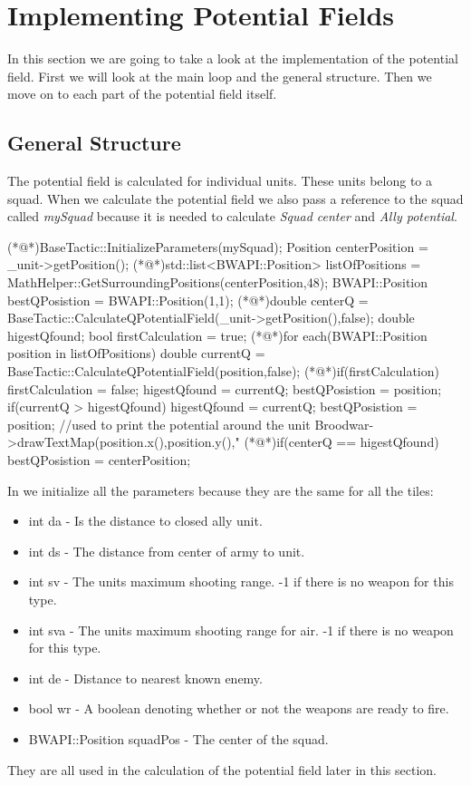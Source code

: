 \section{Implementing Potential Fields}
	In this section we are going to take a look at the implementation of the potential field. First we will look at the main loop and the general structure. Then we move on to each part of the potential field itself.
	
	\subsection{General Structure}
	The potential field is calculated for individual units. These units belong to a squad. When we calculate the potential field we also pass a reference to the squad called \textit{mySquad} because it is needed to calculate \textit{Squad center} and \textit{Ally potential}.
\pagebreak
\begin{Sourcecode}[caption=Main loop]	
(*@\lnote@*)BaseTactic::InitializeParameters(mySquad);
Position centerPosition = _unit->getPosition();
(*@\lnote@*)std::list<BWAPI::Position> listOfPositions = MathHelper::GetSurroundingPositions(centerPosition,48);
BWAPI::Position bestQPosistion = BWAPI::Position(1,1);
(*@\lnote@*)double centerQ = BaseTactic::CalculateQPotentialField(_unit->getPosition(),false);
double higestQfound; 
bool firstCalculation = true;
(*@\lnote@*)for each(BWAPI::Position position in listOfPositions)
{
	double currentQ = BaseTactic::CalculateQPotentialField(position,false);
	(*@\lnote@*)if(firstCalculation)
	{
		firstCalculation = false;
		higestQfound = currentQ;
		bestQPosistion = position;
	} 
	if(currentQ > higestQfound)
	{
		higestQfound = currentQ;
		bestQPosistion = position;
	}
	//used to print the potential around the unit
	Broodwar->drawTextMap(position.x(),position.y(),"%
}
(*@\lnote@*)if(centerQ == higestQfound)
{
	bestQPosistion = centerPosition;
}
\end{Sourcecode}	
	In  we initialize all the parameters because they are the same for all the tiles:
	\begin{itemize}
	    \item int da - Is the distance to closed ally unit.
		\item int ds - The distance from center of army to unit.
		\item int sv - The units maximum shooting range. -1 if there is no weapon for this type.
		\item int sva - The units maximum shooting range for air. -1 if there is no weapon for this type.
		\item int de - Distance to nearest known enemy.
		\item bool wr - A boolean denoting whether or not the weapons are ready to fire.
		\item BWAPI::Position squadPos - The center of the squad.
	\end{itemize}
	They are all used in the calculation of the potential field later in this section.	
	
